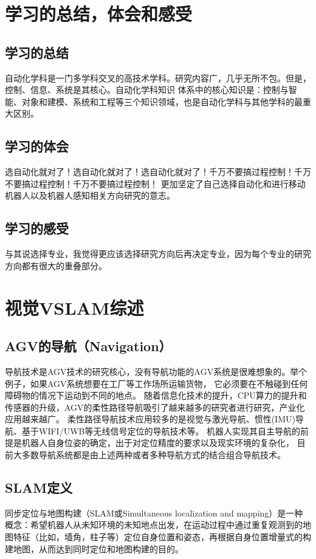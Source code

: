 \documentclass[cs4size,a4paper]{ctexart}
\numberwithin{equation}{section}
\numberwithin{table}{section}
\numberwithin{figure}{section}
\begin{document}
\section{学习的总结，体会和感受}
\subsection{学习的总结}
自动化学科是一门多学科交叉的高技术学科。研究内容广，几乎无所不包。但是，控制、信息、系统是其核心。自动化学科知识
体系中的核心知识是：控制与智能、对象和建模、系统和工程等三个知识领域，也是自动化学科与其他学科的最重大区别。
\subsection{学习的体会}
选自动化就对了！选自动化就对了！选自动化就对了！千万不要搞过程控制！千万不要搞过程控制！千万不要搞过程控制！
更加坚定了自己选择自动化和进行移动机器人以及机器人感知相关方向研究的意志。
\subsection{学习的感受}
与其说选择专业，我觉得更应该选择研究方向后再决定专业，因为每个专业的研究方向都有很大的重叠部分。

\section{视觉VSLAM综述}
\subsection{AGV的导航（Navigation）}
导航技术是AGV技术的研究核心，没有导航功能的AGV系统是很难想象的。举个例子，如果AGV系统想要在工厂等工作场所运输货物，
它必须要在不触碰到任何障碍物的情况下运动到不同的地点。
随着信息化技术的提升，CPU算力的提升和传感器的升级，AGV的柔性路径导航吸引了越来越多的研究者进行研究，产业化应用越来越广。
柔性路径导航技术应用较多的是视觉与激光导航、惯性(IMU)导航\cite{5670227}、基于WIFI/UWB等无线信号定位\cite{4380919}的导航技术等。
机器人实现其自主导航的前提是机器人自身位姿的确定，出于对定位精度的要求以及现实环境的复杂化，
目前大多数导航系统都是由上述两种或者多种导航方式的结合组合导航技术\cite{7916260}。

\subsection{SLAM定义}
同步定位与地图构建（SLAM或Simultaneous localization and mapping）是一种概念：希望机器人从未知环境的未知地点出发，在运动过程中通过重复观测到的地图特征（比如，墙角，柱子等）定位自身位置和姿态，再根据自身位置增量式的构建地图，从而达到同时定位和地图构建的目的。
\end{document}
